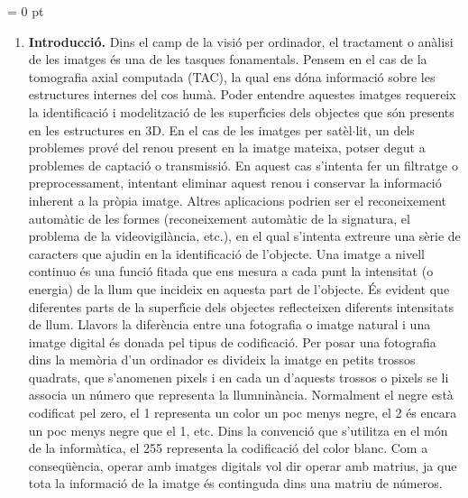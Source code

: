 \documentclass[11pt]{article}
\begin{document}
\parindent = 0 pt

\begin{enumerate}
{\bf Introducci\'{o} als problemes del processament d'imatges.} \vskip 1cm
\item {\bf Introducci\'{o}.} Dins el camp de la visi\'{o} per ordinador, el
tractament o an\`{a}lisi de les imatges \'{e}s una de les tasques fonamentals. Pensem en el cas de la
tomografia axial computada (TAC), la qual ens d\'{o}na informaci\'{o} sobre les estructures internes del
cos hum\`{a}. Poder entendre aquestes imatges requereix la identificaci\'{o} i modelitzaci\'{o} de les
superf\'{\i}cies dels objectes que s\'{o}n presents en les estructures en 3D. En el cas de les imatges per
sat\`{e}l$\cdot$lit, un dels problemes prov\'{e} del renou present en la imatge mateixa, potser degut a problemes
de captaci\'{o} o transmissi\'{o}. En aquest cas s'intenta fer un filtratge o preprocessament, intentant
eliminar aquest renou i conservar la informaci\'{o} inherent a la pr\`{o}pia imatge. Altres aplicacions
podrien ser el reconeixement autom\`{a}tic de les formes (reconeixement autom\`{a}tic de la signatura, el
problema de la videovigil\`{a}ncia, etc.), en el qual s'intenta extreure una s\`{e}rie de caracters que
ajudin en la identificaci\'{o} de l'objecte. Una imatge a nivell continuo \'{e}s una funci\'{o} fitada que ens
mesura a cada punt la intensitat (o energia) de la llum que incideix en aquesta part de l'objecte.
\'{E}s evident que diferentes parts de la superf\'{\i}cie dels objectes reflecteixen diferents intensitats
de llum. Llavors la difer\`{e}ncia entre una fotografia o imatge natural i una imatge digital \'{e}s donada
pel tipus de codificaci\'{o}. Per posar una fotografia dins la mem\`{o}ria d'un ordinador es divideix la
imatge en petits trossos quadrats, que s'anomenen pixels i en cada un d'aquests trossos o pixels se
li associa un n\'umero que representa la llumnin\`{a}ncia. Normalment el negre est\`{a} codificat pel zero,
el 1 representa un color un poc menys negre, el 2 \'{e}s encara un poc menys negre que el 1, etc. Dins
la convenci\'{o} que s'utilitza en el m\'{o}n de la inform\`{a}tica, el 255 representa la codificaci\'{o} del color
blanc. Com a conseq\"{u}\`{e}ncia, operar amb imatges digitals vol dir operar amb matrius, ja que tota la
informaci\'{o} de la imatge \'{e}s continguda dins una matriu de n\'umeros.


\end{enumerate}
\end{document}
